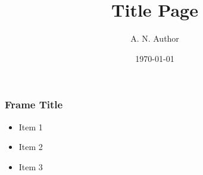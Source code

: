 \documentclass{beamer}
\title{Title Page}
\author{A. N. Author}
\date{\today}
\begin{document}
\begin{frame}
    \titlepage
\end{frame}

\begin{frame}
  \frametitle{Frame Title}
  \begin{itemize}
  \item Item 1
  \item Item 2
  \item Item 3
  \end{itemize}
\end{frame}
\end{document}
